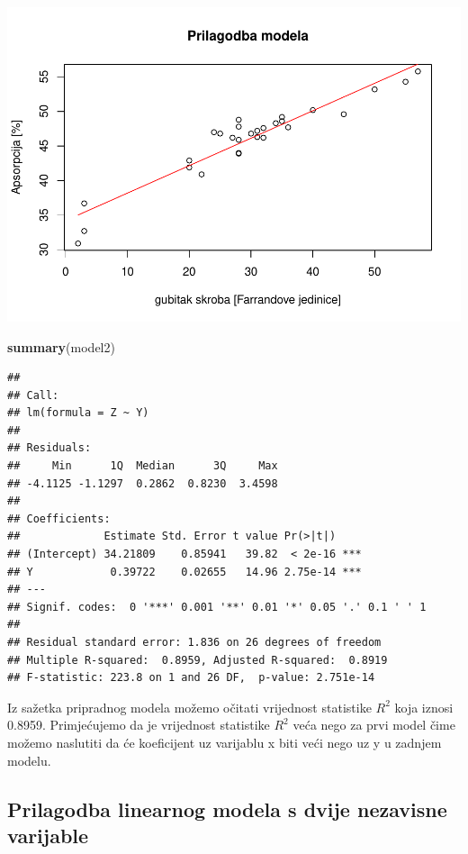 \documentclass[]{article}
\newenvironment{Shaded}{\begin{snugshade}}{\end{snugshade}}
\newcommand{\KeywordTok}[1]{\textcolor[rgb]{0.13,0.29,0.53}{\textbf{{#1}}}}
\newcommand{\NormalTok}[1]{{#1}}
\begin{document}
\includegraphics{Izvjestaj_files/figure-latex/unnamed-chunk-32-1.pdf}

\begin{Shaded}
\begin{Highlighting}[]
\KeywordTok{summary}\NormalTok{(model2)}
\end{Highlighting}
\end{Shaded}

\begin{verbatim}
## 
## Call:
## lm(formula = Z ~ Y)
## 
## Residuals:
##     Min      1Q  Median      3Q     Max 
## -4.1125 -1.1297  0.2862  0.8230  3.4598 
## 
## Coefficients:
##             Estimate Std. Error t value Pr(>|t|)    
## (Intercept) 34.21809    0.85941   39.82  < 2e-16 ***
## Y            0.39722    0.02655   14.96 2.75e-14 ***
## ---
## Signif. codes:  0 '***' 0.001 '**' 0.01 '*' 0.05 '.' 0.1 ' ' 1
## 
## Residual standard error: 1.836 on 26 degrees of freedom
## Multiple R-squared:  0.8959, Adjusted R-squared:  0.8919 
## F-statistic: 223.8 on 1 and 26 DF,  p-value: 2.751e-14
\end{verbatim}

Iz sažetka pripradnog modela možemo očitati vrijednost statistike
\(R^2\) koja iznosi 0.8959. Primjećujemo da je vrijednost statistike
\(R^2\) veća nego za prvi model čime možemo naslutiti da će koeficijent
uz varijablu x biti veći nego uz y u zadnjem modelu.

\subsection{Prilagodba linearnog modela s dvije nezavisne
varijable}\label{prilagodba-linearnog-modela-s-dvije-nezavisne-varijable}
\end{document}

